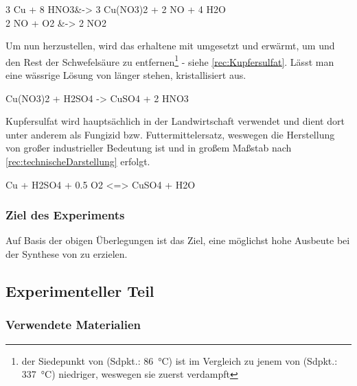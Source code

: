 \documentclass{article}
\begin{document}
        \begin{reactions}
          3 Cu\sld{} + 8 HNO3\aq &-> 3 Cu(NO3)2\aq{} + 2 NO\gas{} + 4 H2O \label{rec:LosenKupfereins} \\
          2 NO\gas{} + O2\gas{} &-> 2 NO2\gas{} 
        \end{reactions} 
        
        Um nun  herzustellen, wird das erhaltene  mit  umgesetzt und erwärmt, um  und den Rest der Schwefelsäure zu entfernen\footnote{der Siedepunkt von  (Sdpkt.: \SI[mode=text]{86}{\degreeCelsius}) ist im Vergleich zu jenem von  (Sdpkt.: \SI[mode=text]{337}{\degreeCelsius}) niedriger, weswegen sie zuerst verdampft} - siehe \ref{rec:Kupfersulfat}. Lässt man eine wässrige Lösung von  länger stehen, kristallisiert  aus.
        
        \begin{reaction}
          Cu(NO3)2\aq{} + H2SO4\aq{} -> CuSO4\aq{} + 2 HNO3\aq \label{rec:Kupfersulfat}
        \end{reaction} 
         
        Kupfersulfat wird hauptsächlich in der Landwirtschaft verwendet und dient dort unter anderem als Fungizid bzw. Futtermittelersatz, weswegen die Herstellung von großer industrieller Bedeutung ist und in großem Maßstab nach \ref{rec:technischeDarstellung} erfolgt.
        
        \begin{reaction}
          Cu\sld{} + H2SO4\aq{} + 0.5 O2\gas{} <=> CuSO4\aq{} + H2O \label{rec:technischeDarstellung}
        \end{reaction}
        
   
      \subsubsection{Ziel des Experiments}
    
        Auf Basis der obigen Überlegungen ist das Ziel, eine möglichst hohe Ausbeute bei der Synthese von  zu erzielen.
    
    \subsection{Experimenteller Teil}
  
      \subsubsection{Verwendete Materialien}
              
\end{document}
